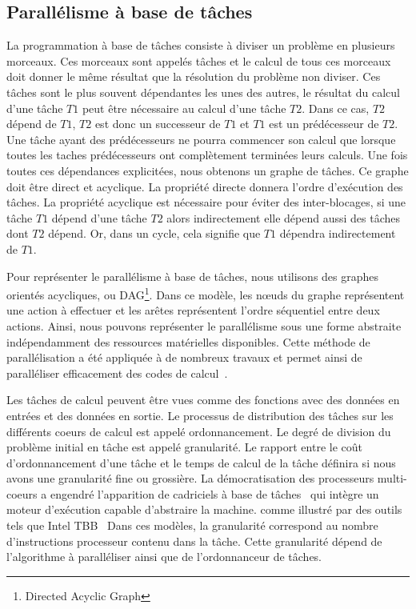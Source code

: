 \subsection{Parallélisme à base de tâches}
La programmation à base de tâches consiste à diviser un problème en plusieurs morceaux.
%
Ces morceaux sont appelés tâches et le calcul de tous ces morceaux doit donner le même résultat que la résolution du problème non diviser.
%
Ces tâches sont le plus souvent dépendantes les unes des autres, le résultat du calcul d'une tâche $T1$ peut être nécessaire au calcul d'une tâche $T2$.
%
Dans ce cas, $T2$ dépend de $T1$, $T2$ est donc un successeur de $T1$ et $T1$ est un prédécesseur de $T2$.
%
Une tâche ayant des prédécesseurs ne pourra commencer son calcul que lorsque toutes les taches prédécesseurs ont complètement terminées leurs calculs.
%
Une fois toutes ces dépendances explicitées, nous obtenons un graphe de tâches.
%
Ce graphe doit être direct et acyclique.
%
La propriété directe donnera l'ordre d'exécution des tâches.
%
La propriété acyclique est nécessaire pour éviter des inter-blocages, si une tâche $T1$ dépend d'une tâche $T2$ alors indirectement elle dépend aussi des tâches dont $T2$ dépend.
%
Or, dans un cycle, cela signifie que $T1$ dépendra indirectement de $T1$.

Pour représenter le parallélisme à base de tâches, nous utilisons des graphes orientés acycliques, ou DAG\footnote{Directed Acyclic Graph}.
%
Dans ce modèle, les n{\oe}uds du graphe représentent une action à effectuer et les arêtes représentent l'ordre séquentiel entre deux actions.
%
Ainsi, nous pouvons représenter le parallélisme sous une forme abstraite indépendamment des ressources matérielles disponibles.
%
Cette méthode de parallélisation a été appliquée à de nombreux travaux et permet ainsi de paralléliser efficacement des codes de calcul~\cite{BBAC2014,LSAT2013,LY2012,ABGL2013}.

Les tâches de calcul peuvent être vues comme des fonctions avec des données en entrées et des données en sortie.
%
Le processus de distribution des tâches sur les différents coeurs de calcul est appelé ordonnancement.
%
Le degré de division du problème initial en tâche est appelé granularité.
%
Le rapport entre le coût d'ordonnancement d'une tâche et le temps de calcul de la tâche définira si nous avons une granularité fine ou grossière.
%
La démocratisation des processeurs multi-coeurs a engendré l'apparition de cadriciels à base de tâches~\cite{taskscomparison} qui intègre un moteur d'exécution capable d'abstraire la machine.
 comme illustré par des outils tels que Intel TBB~\cite{Intel_TBB}
%
Dans ces modèles, la granularité correspond au nombre d'instructions processeur contenu dans la tâche.
%
Cette granularité dépend de l'algorithme à paralléliser ainsi que de l'ordonnanceur de tâches.

